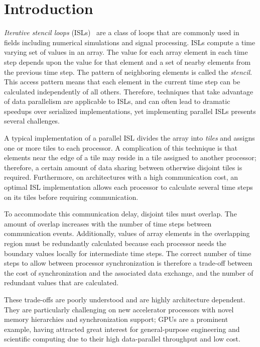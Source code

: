 \documentclass{sig-alternate}
\begin{document}

\section{Introduction}

{\em Iterative stencil loops} (ISLs)~\cite{li} are a class of loops that are
commonly used in fields including numerical simulations and signal
processing.  ISLs compute a time varying set of values in an array.  The
value for each array element in each time step depends upon the value for
that element and a set of nearby elements from the previous time step.  The
pattern of neighboring elements is called the {\em stencil}.  This access
pattern means that each element in the current time step can be calculated
independently of all others.  Therefore, techniques that take advantage of
data parallelism are applicable to ISLs, and can often lead to dramatic
speedups over serialized implementations, yet implementing parallel ISLs
presents several challenges.

A typical implementation of a parallel ISL divides the array into {\em tiles}
and assigns one or more tiles to each processor.  A complication of this
technique is that elements near the edge of a tile may reside in a tile
assigned to another processor; therefore, a certain amount of data sharing
between otherwise disjoint tiles is required.  Furthermore, on architectures
with a high communication cost, an optimal ISL implementation allows each
processor to calculate several time steps on its tiles before requiring
communication.

To accommodate this communication delay, disjoint tiles must overlap.  The
amount of overlap increases with the number of time steps between
communication events.  Additionally, values of array elements in the
overlapping region must be redundantly calculated because each processor
needs the boundary values locally for intermediate time steps.  The correct
number of time steps to allow between processor synchronization is therefore
a trade-off between the cost of synchronization and the associated data
exchange, and the number of redundant values that are calculated.

These trade-offs are poorly understood and are highly architecture dependent.
They are particularly challenging on new accelerator processors with novel
memory hierarchies and synchronization support; GPUs are a prominent example,
having attracted great interest for general-purpose engineering and
scientific computing due to their high data-parallel throughput and low cost.
\end{document}
